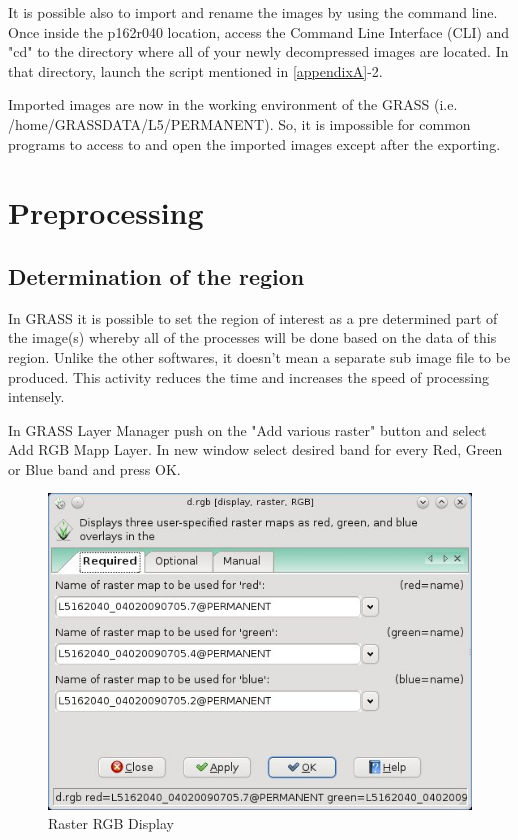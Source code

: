 It is possible also to import and rename the images by using the command line. Once inside the p162r040 location, access the Command Line Interface (CLI) and "cd" to the directory where all of your newly decompressed images are located. In that directory, launch the script mentioned in \ref{appendixA}-2.\newline

Imported images are now in the working environment of the GRASS (i.e. /home/GRASSDATA/L5/PERMANENT). So, it is impossible for common programs to access to and open the imported images except after the exporting.\newline

\section{Preprocessing}
\subsection{Determination of the region}
In GRASS it is possible to set the region of interest as a pre determined part of the image(s) whereby all of the processes will be done based on the data of  this region. Unlike the other softwares, it doesn't mean a separate sub image file to be produced. This activity reduces the time and increases the speed of processing  intensely.\newline

In GRASS Layer Manager push on the "Add various raster" button and select Add RGB Mapp Layer. In new window select desired band for every Red, Green or Blue band and press OK.\newline

\begin{figure}[htbp]
   \centering
   \includegraphics[scale=0.4]{gipe011.png}
   \caption{Raster RGB Display}
   \label{fig:gipe011}
\end{figure}

